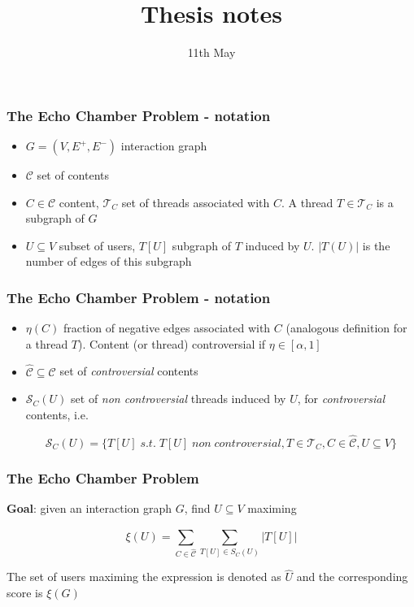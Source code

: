 \documentclass{beamer}
\title{Thesis notes}
\date{11th May}
\begin{document}
\frame{\titlepage}

\begin{frame}[c]
	\frametitle{The Echo Chamber Problem - notation}

	\begin{itemize}
		\item $G = (V, E ^{+}, E ^{-}) $ interaction graph
		\item $ \mathcal{C} $ set of contents
		\item $C \in \mathcal{C} $ content, $\mathcal{T} _{C} $ set of threads
		      associated with $C$. A thread $T \in \mathcal{T} _{C} $ is a
		      subgraph of $G$
		\item $U \subseteq V$ subset of users, $T[U]$ subgraph of $T$ induced
		      by $U$. $|T(U)|$ is the number of edges of this subgraph
	\end{itemize}
\end{frame}

\begin{frame}[c]
	\frametitle{The Echo Chamber Problem - notation}
	\begin{itemize}
		\item $\eta(C)$ fraction of negative edges associated with $C$
		      (analogous definition for a thread $T$). Content (or thread)
		      controversial if $\eta \in [\alpha, 1]$
		\item $\hat{\mathcal{C} } \subseteq \mathcal{C} $ set of \textit{controversial}
		      contents

		\item $\mathcal{S} _C (U)$ set of \textit{non controversial} threads
		      induced by $U$, for \textit{controversial} contents, i.e.

			      {\small
				      \begin{equation}
					      \mathcal{S} _{C} (U) = \{ T[U] \; s.t. \; T[U] \; non \;
					      controversial, T \in \mathcal{T} _{C}, C
					      \in \hat{\mathcal{C}}, U \subseteq V\}
				      \end{equation}
			      }
	\end{itemize}

\end{frame}

\begin{frame}[c]
	\frametitle{The Echo Chamber Problem}
	\textbf{Goal}: given an interaction graph $G$, find $U \subseteq V$ maximing

	\begin{equation}
		\xi (U) = \sum^{}_{C \in \hat{\mathcal{C}} } \sum^{}_{T[U] \in S_C (U)}
		| T[U] |
	\end{equation}

	The set of users maximing the expression is denoted as $\hat{U}$ and the
	corresponding score is $\xi(G)$
\end{frame}
\end{document}

